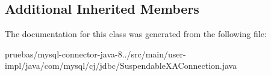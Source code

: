 \subsection*{Additional Inherited Members}


The documentation for this class was generated from the following file\+:\begin{DoxyCompactItemize}
\item 
pruebas/mysql-\/connector-\/java-\/8../src/main/user-\/impl/java/com/mysql/cj/jdbc/Suspendable\+X\+A\+Connection.\+java\end{DoxyCompactItemize}

